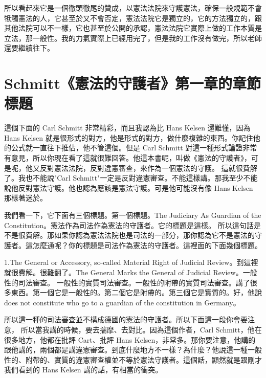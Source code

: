 \hypertarget{w05:cue:198}{}所以看起來它是一個徹頭徹尾的贊成，以憲法法院來守護憲法，確保一般規範不會牴觸憲法的人，它甚至於又不會否定，憲法法院它是獨立的，它的方法獨立的，跟其他法院可以不一樣，它也甚至於公開的承認，憲法法院它實際上做的工作本質是立法，那一般性。我的力氣實際上已經用完了，但是我的工作沒有做完，所以老師還要繼續往下。

\section{Schmitt《憲法的守護者》第一章的章節標題}

\hypertarget{w05:cue:199}{}這個下面的 Carl Schmitt 非常精彩，而且我認為比 Hans Kelsen 還難懂，因為 Hans Kelsen 就是很形式的對方，他是形式的對方，做什麼複雜的東西。你記住他的公式就一直往下推佔，他不管這個。但是 Carl Schmitt 對這一種形式論證非常有意見，所以你現在看了這就很難回答。他這本書呢，叫做《憲法的守護者》，可是呢，他又反對憲法法院，反對違憲審查，來作為一個憲法的守護。
\hypertarget{w05:cue:200}{}這就很費解了。我也不能說"Carl Schmitt"一定是反對違憲審查。不能這樣講。那我至少不能說他反對憲法守護。他也認為應該是憲法守護。可是他可能沒有像 Hans Kelsen 那樣著迷於。

\hypertarget{w05:cue:201}{}我們看一下，它下面有三個標題。第一個標題。The Judiciary As Guardian of the Constitution。憲法作為司法作為憲法的守護者。它的標題是這樣。
\hypertarget{w05:cue:202}{}所以這句話是不是很費解。那如果你認為憲法法院也是司法的一部分，那你認為它不是憲法的守護者。這怎麼通呢？你的標題是司法作為憲法的守護者。這裡面的下面幾個標題。

\hypertarget{w05:cue:203}{}1.The General or Accessory, so-called Material Right of Judicial Review。到這裡就很費解。很難翻了。The General Marks the General of Judicial Review。一般性的司法審查。
\hypertarget{w05:cue:204}{}一般性的實質司法審查。一般性的附帶的實質司法審查。講了很多東西。第一個它是一般性的。第二個它是附帶的。第三個它是實質的。好，他說 does not constitute who go to a guardian of the constitution in Germany。

\hypertarget{w05:cue:205}{}所以這一種的司法審查並不構成德國的憲法的守護者。所以下面這一段你會要注意，
\hypertarget{w05:cue:206}{}所以當我講的時候，要去揣摩、去對比。因為這個作者，Carl Schmitt，他在很多地方，他都在批評 Cart、批評 Hans Kelsen，非常多。那你要注意，他講的跟他講的，兩個都是講違憲審查。到底什麼地方不一樣？為什麼？他說這一種一般性的、附帶的、實質的違憲審查權並不等於憲法守護者。這個話，顯然就是跟剛才我們看到的 Hans Kelsen 講的話，有相當的衝突。

